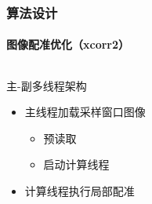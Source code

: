 \documentclass{beamer}
\begin{document}
\begin{frame}
    \frametitle{算法设计}
    \framesubtitle{图像配准优化（xcorr2）}

    \begin{columns}
        \begin{column}{0.5\textwidth}
            \begin{block}{主-副多线程架构}
            \begin{itemize}
                \item 主线程加载采样窗口图像
                \begin{itemize}
                    \item 预读取
                    \item 启动计算线程
                \end{itemize}
                \item 计算线程执行局部配准
            \end{itemize}
            \end{block}


\end{column}
\end{columns}
\end{frame}
\end{document}
